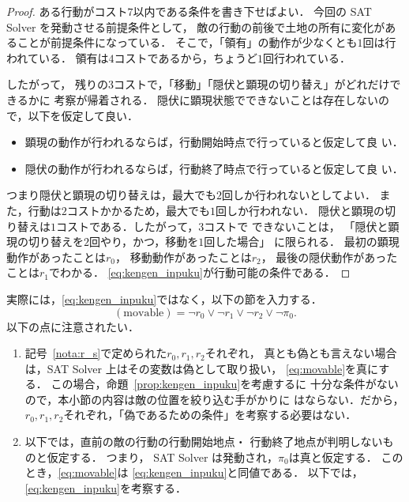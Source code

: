 \begin{proof}
 ある行動がコスト$7$以内である条件を書き下せばよい．
 今回の SAT Solver を発動させる前提条件として，
 敵の行動の前後で土地の所有に変化があることが前提条件になっている．
 そこで，「領有」の動作が少なくとも$1$回は行われている．
 領有は$4$コストであるから，ちょうど$1$回行われている．

 したがって，
 残りの$3$コストで，「移動」「隠伏と顕現の切り替え」がどれだけできるかに
 考察が帰着される． 
 隠伏に顕現状態でできないことは存在しないので，以下を仮定して良い．
 \begin{itemize}
  \item 顕現の動作が行われるならば，行動開始時点で行っていると仮定して良
        い．
  \item 隠伏の動作が行われるならば，行動終了時点で行っていると仮定して良
        い．
 \end{itemize} 
 つまり隠伏と顕現の切り替えは，最大でも$2$回しか行われないとしてよい．
 また，行動は$2$コストかかるため，最大でも$1$回しか行われない．
 隠伏と顕現の切り替えは$1$コストである．したがって，$3$コストで
 できないことは，
 「隠伏と顕現の切り替えを$2$回やり，かつ，移動を$1$回した場合」
 に限られる．
 最初の顕現動作があったことは$r_0$，
 移動動作があったことは$r_2$，
 最後の隠伏動作があったことは$r_1$でわかる．
 \eqref{eq:kengen_inpuku}が行動可能の条件である．\qedhere
\end{proof}

\begin{rem} \label{rem:kengen_inpuku_omit}
 実際には，\eqref{eq:kengen_inpuku}ではなく，以下の節を入力する．
 \begin{equation}
  (\text{movable}) = \lnot r_0 \lor \lnot r_1 \lor \lnot r_2 \lor \lnot \pi_0.
   \label{eq:movable}
 \end{equation}
 以下の点に注意されたい．
 \begin{enumerate}[1.]
  \item 記号~\ref{nota:r_s}で定められた$r_0, r_1, r_2$それぞれ，
        真とも偽とも言えない場合は，SAT Solver 上はその変数は偽として取り扱い，
        \eqref{eq:movable}を真にする．
        この場合，命題~\ref{prop:kengen_inpuku}を考慮するに
        十分な条件がないので，本小節の内容は敵の位置を絞り込む手がかりに
        はならない．だから，
        $r_0, r_1, r_2$それぞれ，「偽であるための条件」を考察する必要はない．
  \item 以下では，直前の敵の行動の行動開始地点・
        行動終了地点が判明しないものと仮定する．
        つまり， SAT Solver は発動され，$\pi_0$は真と仮定する．
        このとき，\eqref{eq:movable}は
        \eqref{eq:kengen_inpuku}と同値である．
        以下では，\eqref{eq:kengen_inpuku}を考察する．
 \end{enumerate}
\end{rem}

